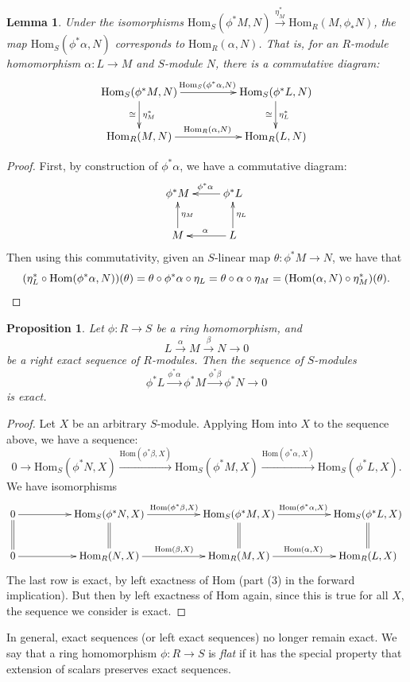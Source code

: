 \documentclass{amsart}[12pt]
\newcommand{\Hom}{\mathrm{Hom}}
\numberwithin{equation}{section}
\theoremstyle{plain} %
\newtheorem{lem}[equation]{Lemma}
\newtheorem{prop}[equation]{Proposition}
\theoremstyle{definition}
\theoremstyle{remark}
\newcommand{\xra}[1]{\xrightarrow{#1}}
\begin{document}
\begin{lem} Under the isomorphisms $\Hom_S(\phi^*M,N) \xra{\eta_M^*} \Hom_R(M,\phi_* N)$, the map $\Hom_S(\phi^*\alpha,N)$ corresponds to $\Hom_R(\alpha,N)$.
That is, for an $R$-module homomorphism $\alpha:L\to M$ and $S$-module $N$, there is a commutative diagram:
\[\xymatrix@C=5em{
 \Hom_S(\phi^* M, N) \ar[r]^{\Hom_S(\phi^*\alpha,N)} \ar[d]^{\eta_M^*}_{\cong} &  \Hom_S(\phi^* L, N) \ar[d]^{\eta_L^*}_{\cong} \\
 \Hom_R(M,N) \ar[r]^{\Hom_R(\alpha,N)} & \Hom_R(L,N)
}\]
\end{lem}
\begin{proof}
First, by construction of $\phi^*\alpha$, we have a commutative diagram:
\[ \xymatrix{
\phi^*M & \ar[l]_{\phi^* \alpha} \phi^* L \\
M \ar[u]_{\eta_M} & L \ar[l]_{\alpha} \ar[u]_{\eta_L}}\]
Then using this commutativity, given an $S$-linear map $\theta:\phi^*M \to N$, we have that
\[(\eta_L^* \circ \Hom(\phi^*\alpha,N)) (\theta) = \theta \circ \phi^*\alpha \circ \eta_L = \theta \circ \alpha \circ \eta_M = (\Hom(\alpha,N) \circ \eta_M^*)(\theta).\qedhere\]
\end{proof}

\begin{prop} Let $\phi:R\to S$ be a ring homomorphism, and 
\[ L \xra{\alpha} M \xra{\beta} N \to 0\]
be a right exact sequence of $R$-modules. Then the sequence of $S$-modules
\[ \phi^*L \xra{\phi^*\alpha} \phi^*M \xra{\phi^*\beta} \phi^*N \to 0\]
is exact.
\end{prop}
\begin{proof}
Let $X$ be an arbitrary $S$-module. Applying Hom into $X$ to the sequence above, we have a sequence:
\[ 0 \to \Hom_S(\phi^*N,X)  \xra{\Hom(\phi^*\beta,X)} \Hom_S(\phi^*M,X) \xra{\Hom(\phi^*\alpha,X)} \Hom_S(\phi^*L,X).\]
We have isomorphisms
\[ \xymatrix@C=5em{ 
0 \ar[r] \ar@{=}[d]  & \Hom_S(\phi^*N,X)  \ar[r]^{\Hom(\phi^*\beta,X)} \ar@{=}[d] & \Hom_S(\phi^*M,X) \ar[r]^{\Hom(\phi^*\alpha,X)} \ar@{=}[d] & \Hom_S(\phi^*L,X) \ar@{=}[d] \\
0 \ar[r] & \Hom_R(N,X) \ar[r]^{\Hom(\beta,X)} & \Hom_R(M,X) \ar[r]^{\Hom(\alpha,X)} & \Hom_R(L,X) }\]
The last row is exact, by left exactness of Hom (part (3) in the forward implication). But then by left exactness of Hom again, since this is true for all $X$, the sequence we consider is exact.
\end{proof}

In general, exact sequences (or left exact sequences) no longer remain exact. We say that a ring homomorphism $\phi:R\to S$ is \emph{flat} if it has the special property that extension of scalars preserves exact sequences.
\end{document}
